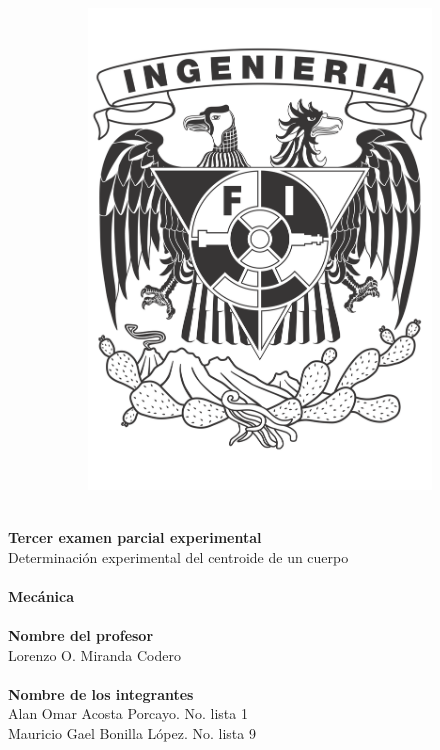 \documentclass[12pt, titlepage]{report}
\begin{document}
\begin{titlepage}
\begin{center}
\begin{figure}[ht]
\begin{subfigure}[l]{0.2\textwidth}
                    \includegraphics[width=\textwidth]{Escudo_FI.png}
                \end{subfigure} 
            \end{figure}

            \Huge \textbf{\\Tercer examen parcial experimental\\}
            \huge Determinación experimental del centroide de un cuerpo\\
            \Huge \textbf{\\Mecánica\\}
            \huge \textbf{\\Nombre del profesor\\}
            \Large{Lorenzo O. Miranda Codero\\}
            \huge \textbf{\\Nombre de los integrantes\\}
            \Large{Alan Omar Acosta Porcayo. No. lista 1\\Mauricio Gael Bonilla López. No. lista 9\\}
        \end{center}
    \end{titlepage}
\end{document}
